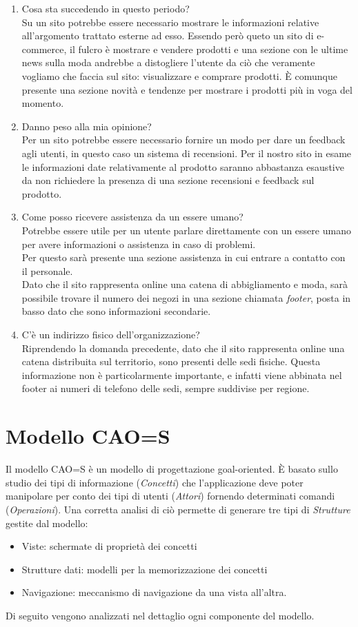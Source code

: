 \documentclass[12pt,a4paper]{report}
\begin{document}
\begin{enumerate}
  \item Cosa sta succedendo in questo periodo?\\
  Su un sito potrebbe essere necessario mostrare le informazioni relative all'argomento trattato esterne ad esso. Essendo però queto un sito di e-commerce, il fulcro è mostrare e vendere prodotti e una sezione con le ultime news sulla moda andrebbe a distogliere l'utente da ciò che veramente vogliamo che faccia sul sito: visualizzare e comprare prodotti. È comunque presente una sezione novità e tendenze per mostrare i prodotti più in voga del momento.
  \item Danno peso alla mia opinione?\\
  Per un sito potrebbe essere necessario fornire un modo per dare un feedback agli utenti, in questo caso un sistema di recensioni. Per il nostro sito in esame le informazioni date relativamente al prodotto saranno abbastanza esaustive da non richiedere la presenza di una sezione recensioni e feedback sul prodotto.
  \item Come posso ricevere assistenza da un essere umano?\\
  Potrebbe essere utile per un utente parlare direttamente con un essere umano per avere informazioni o assistenza in caso di problemi.\\Per questo sarà presente una sezione assistenza in cui entrare a contatto con il personale.\\
  Dato che il sito rappresenta online una catena di abbigliamento e moda, sarà possibile trovare il numero dei negozi in una sezione chiamata \textit{footer}, posta in basso dato che sono informazioni secondarie.
  \item C'è un indirizzo fisico dell'organizzazione?\\
  Riprendendo la domanda precedente, dato che il sito rappresenta online una catena distribuita sul territorio, sono presenti delle sedi fisiche. Questa informazione non è particolarmente importante, e infatti viene abbinata nel footer ai numeri di telefono delle sedi, sempre suddivise per regione.
\end{enumerate}

\section{Modello CAO=S}
Il modello CAO=S è un modello di progettazione goal-oriented. È basato sullo studio dei tipi di informazione (\textit{Concetti}) che l'applicazione deve poter manipolare per conto dei tipi di utenti (\textit{Attori}) fornendo determinati comandi (\textit{Operazioni}). Una corretta analisi di ciò permette di generare tre tipi di \textit{Strutture} gestite dal modello:
\begin{itemize}
  \item Viste:  schermate di proprietà dei concetti
  \item Strutture dati: modelli per la memorizzazione dei concetti
  \item Navigazione:  meccanismo di navigazione da una vista all'altra.
\end{itemize}
Di seguito vengono analizzati nel dettaglio ogni componente del modello.
\end{document}
